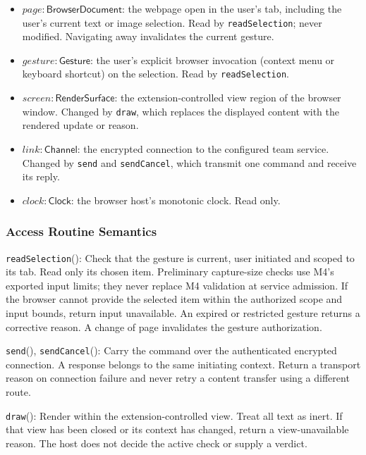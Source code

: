 \documentclass[12pt, titlepage]{article}
\newcommand{\ty}[1]{\textsf{#1}}
\begin{document}
\begin{itemize}
\item $\mathit{page}:\ty{BrowserDocument}$: the webpage open in the user's tab, including the user's current text or image selection. Read by \texttt{readSelection}; never modified. Navigating away invalidates the current gesture.
\item $\mathit{gesture}:\ty{Gesture}$: the user's explicit browser invocation (context menu or keyboard shortcut) on the selection. Read by \texttt{readSelection}.
\item $\mathit{screen}:\ty{RenderSurface}$: the extension-controlled view region of the browser window. Changed by \texttt{draw}, which replaces the displayed content with the rendered update or reason.
\item $\mathit{link}:\ty{Channel}$: the encrypted connection to the configured team service. Changed by \texttt{send} and \texttt{sendCancel}, which transmit one command and receive its reply.
\item $\mathit{clock}:\ty{Clock}$: the browser host's monotonic clock. Read only.
\end{itemize}

\subsubsection{Access Routine Semantics}

\noindent \texttt{readSelection}():
Check that the gesture is current, user initiated and scoped to its tab. Read only its chosen item. Preliminary capture-size checks use M4's exported input limits; they never replace M4 validation at service admission. If the browser cannot provide the selected item within the authorized scope and input bounds, return input unavailable. An expired or restricted gesture returns a corrective reason. A change of page invalidates the gesture authorization.

\medskip\noindent \texttt{send}(), \texttt{sendCancel}():
Carry the command over the authenticated encrypted connection. A response belongs to the same initiating context. Return a transport reason on connection failure and never retry a content transfer using a different route.

\medskip\noindent \texttt{draw}():
Render within the extension-controlled view. Treat all text as inert. If that view has been closed or its context has changed, return a view-unavailable reason. The host does not decide the active check or supply a verdict.
\end{document}
